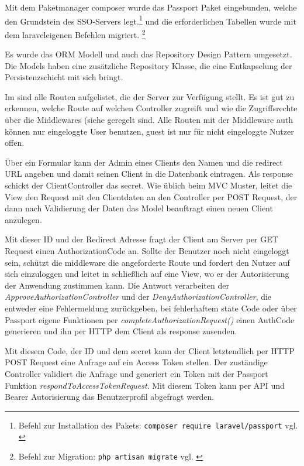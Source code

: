 Mit dem Paketmanager composer wurde das Passport Paket eingebunden, welche den Grundstein des SSO-Servers legt.\footnote{Befehl zur Installation des Pakets: \texttt{composer require laravel/passport} vgl. \cite{composer}} und die erforderlichen Tabellen wurde mit dem laraveleigenen Befehlen migriert. \footnote{Befehl zur Migration: \texttt{php artisan migrate} vgl. \cite{Laravel}}

Es wurde das ORM Modell und auch das Repository Design Pattern umgesetzt. Die Models haben eine zusätzliche  Repository Klasse, die eine Entkapselung der Persistenzschicht mit sich bringt.

Im  sind alle Routen aufgelistet, die der Server zur Verfügung stellt. Es ist gut zu erkennen, welche Route auf welchen Controller zugreift und wie die Zugriffsrechte über die Middlewares (siehe  geregelt sind. Alle Routen mit der Middleware auth können nur eingeloggte User benutzen, guest ist nur für nicht eingeloggte Nutzer offen.

Über ein Formular kann der Admin eines Clients den Namen und die redirect URL angeben und damit seinen Client in die Datenbank eintragen. Als response schickt der ClientController das secret.
Wie üblich beim MVC Muster, leitet die View den Request mit den Clientdaten an den Controller per POST Request, der dann nach Validierung der Daten das Model beauftragt einen neuen Client anzulegen. 

Mit dieser ID und der Redirect Adresse fragt der Client am Server per GET Request einen AuthorizationCode an. Sollte der Benutzer noch nicht eingeloggt sein, schützt die middleware die angeforderte Route und fordert den Nutzer auf sich einzuloggen und leitet in schließlich auf eine View, wo er der Autorisierung der Anwendung zustimmen kann. Die Antwort verarbeiten der \textit{ApproveAuthorizationController} und der \textit{DenyAuthorizationController}, die entweder eine Fehlermeldung zurückgeben, bei fehlerhaftem state Code oder über Passport eigene Funktionen per \textit{completeAuthorizationRequest()} einen AuthCode generieren und ihn per HTTP dem Client als response zusenden.

Mit diesem Code, der ID und dem secret kann der Client letztendlich per HTTP POST Request eine Anfrage auf ein Access Token stellen. Der zuständige Controller validiert die Anfrage und generiert ein Token mit der Passport Funktion \textit{respondToAccessTokenRequest}. Mit diesem Token kann per API und Bearer Autorisierung das Benutzerprofil abgefragt werden.

